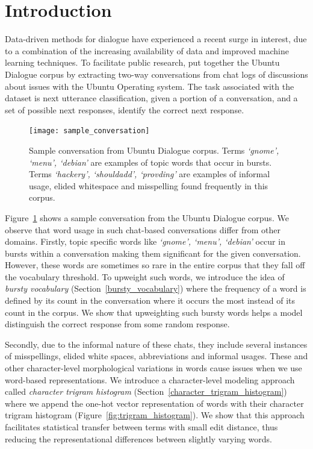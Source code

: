 \documentclass[11pt]{report}
\begin{document}
\section{Introduction}

Data-driven methods for dialogue have experienced a recent surge in interest, due to a combination of the increasing availability of data and improved machine learning techniques.  To facilitate public research, \cite{lowe2015ubuntu} put together the Ubuntu Dialogue corpus by extracting two-way conversations from chat logs of discussions about issues with the Ubuntu Operating system. The task associated with the dataset is next utterance classification, given a portion of a conversation, and a set of possible next responses, identify the correct next response.

\begin{figure}[t]\label{sample_conversation}
\texttt{[image: sample\_conversation]}
\caption{Sample conversation from Ubuntu Dialogue corpus. Terms \textit{`gnome', `menu', `debian'} are examples of topic words that occur in bursts. Terms \textit{`hackery', `shouldadd', `provding'} are examples of informal usage, elided whitespace and misspelling found frequently in this corpus.}
\vspace{-1.0em}
\end{figure}

Figure~\ref{sample_conversation} shows a sample conversation from the Ubuntu Dialogue corpus. We observe that word usage in such chat-based conversations differ from other domains. Firstly, topic specific words like \textit{`gnome', `menu', `debian'} occur in bursts within a conversation making them significant for the given conversation. However, these words are sometimes so rare in the entire corpus that they fall off the vocabulary threshold. To upweight such words, we introduce the idea of \textit{bursty vocabulary} (Section~\ref{bursty_vocabulary}) where the frequency of a word is defined by its count in the conversation where it occurs the most instead of its count in the corpus. We show that upweighting such bursty words helps a model distinguish the correct response from some random response. %

Secondly, due to the informal nature of these chats, they include several instances of misspellings, elided white spaces, abbreviations and informal usages. These and other character-level morphological variations in words cause issues when we use word-based representations. We introduce a character-level modeling approach called \textit{character trigram histogram} (Section~\ref{character_trigram_histogram}) where we append the one-hot vector representation of words with their character trigram histogram (Figure~\ref{fig:trigram_histogram}). We show that this approach facilitates statistical transfer between terms with small edit distance, thus reducing the representational differences between slightly varying words.
\end{document}
